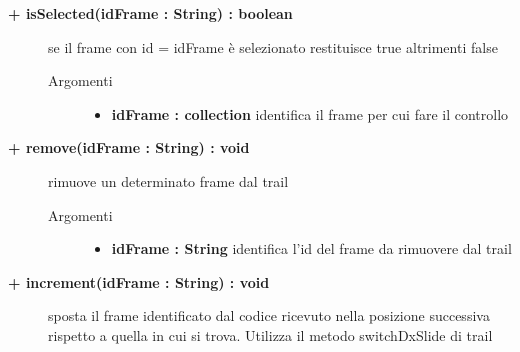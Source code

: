 \begin{description}
\begin{description}
\begin{description}
\begin{itemize}
				\end{itemize}
		\end{description}
	\end{description}
	
	\begin{description}
		\item[\textbf{\color{blue}+ isSelected(idFrame : String) : boolean			}] \hfill
			se il frame con id = idFrame è selezionato restituisce true altrimenti false
			
		\begin{description}
			\item[Argomenti] \hfill
				\begin{itemize}
				
					\item \textbf{idFrame : collection			} \hfill
						identifica il frame per cui fare il controllo
					
				\end{itemize}
		\end{description}
	\end{description}
	
	\begin{description}
		\item[\textbf{\color{blue}+ remove(idFrame : String) : void			}] \hfill
			rimuove un determinato frame dal trail
			
		\begin{description}
			\item[Argomenti] \hfill
				\begin{itemize}
				
					\item \textbf{idFrame : String			} \hfill
						identifica l'id del frame da rimuovere dal trail
					
				\end{itemize}
		\end{description}
	\end{description}
	
	\begin{description}
		\item[\textbf{\color{blue}+ increment(idFrame : String) : void			}] \hfill
			sposta il frame identificato dal codice ricevuto nella posizione successiva rispetto a quella in cui si trova. Utilizza il metodo switchDxSlide di trail
			

\end{description}
\end{description}
